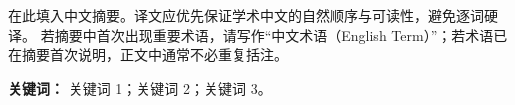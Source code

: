 在此填入中文摘要。译文应优先保证学术中文的自然顺序与可读性，避免逐词硬译。
若摘要中首次出现重要术语，请写作“中文术语（English Term）”；若术语已在摘要首次说明，正文中通常不必重复括注。

\textbf{关键词：} 关键词 1；关键词 2；关键词 3。
